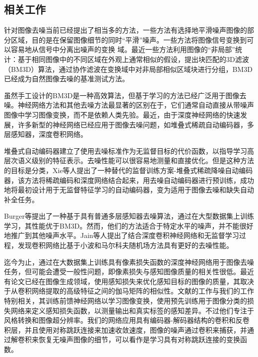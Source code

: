 \subsection{相关工作}
针对图像去噪当前已经提出了相当多的方法，一些方法有选择地平滑噪声图像的部分区域，目的是在保留图像细节的同时“平滑”噪声。一些方法将图像信号变换到可以容易地从信号中分离出噪声的变换 域。最近一些方法利用图像的“非局部”统计：基于相同图像中的不同区域在外观上通常相似的假设，提出块匹配的3D滤波（BM3D）算法\cite{Dabov2007}，通过协作滤波在变换域中对非局部相似区域块进行分组，BM3D已经成为自然图像去噪的基准测试方法。

虽然手工设计的BM3D是一种高效算法，但基于学习的方法已经广泛用于图像去噪。神经网络方法和其他去噪方法最显著的区别在于，它们通常自动直接从带噪声图像中学习图像变换，而不是依赖人类先验。最近，由于深度神经网络的快速发展，许多新型的神经网络已经应用于图像去噪问题，如堆叠式稀疏自动编码器\cite{Vincent2008,Xie2012,Agostinelli2013,Technologii2013a,Skribtsov2016}，多层感知器\cite{Burger2012,Wang2014a}，深度卷积网络\cite{Jain2009,Wu2014,Zhao2015,Mao2016,Eigen2013,Wu2014relu,Wang2015g}。

堆叠式自动编码器\cite{Vincent2008}建立了使用去噪标准作为无监督目标的代价函数，以指导学习高层次语义级别的特征表示。去噪性能可以很容易地测量和直接优化。但是这种方法的目标是分类，Xie等人\cite{Xie2012}提出了一种替代的监督训练方案-堆叠式稀疏降噪自动编码器，该方法将稀疏编码和深度网络结合起来，用去噪自动编码器进行预训练，成功地将最初设计用于无监督特征学习的自动编码器，变为适用于图像去噪和缺失自动补全任务。

Burger等\cite{Burger2012}提出了一种基于具有普通多层感知器去噪算法，通过在大型数据集上训练学习，其性能优于BM3D。然而，他们的方法适合于特定水平的噪声，并不能很好地推广到其他噪声水平。Jain等人\cite{Jain2009}提出了结合深度卷积神经网络和无监督学习过程，发现卷积网络比基于小波和马尔科夫随机场方法具有更好的去噪性能。

迄今为止，通过在大数据集上训练具有像素损失函数的深度神经网络用于图像去噪任务，但可能会遭受一般性问题，即像素损失与感知图像质量的相关性很低\cite{Zhao2015}。最近有论文已经在图像生成领域，使用感知损失来优化感知目标的图像的质量，其取决于从卷积网络提取的高级特征之间的伽马矩阵的相似性\cite{Dosovitskiy2016}。文献的工作与我们的工作特别相关，其训练前馈神经网络以学习图像变换，使用预先训练用于图像分类的损失网络来定义感知损失函数，以测量输出和真实标签的感知差异。不过他们专注于风格转换和图像超分辨率。我们的网络应用具有编码器-解码器结构的卷积和反卷积层，并且使用对称跳跃连接来加速收敛速度，图像的噪声通过卷积来捕获，并通过解卷积来恢复无噪声图像的细节，可以看作是学习具有对称跳跃连接的变换函数。

